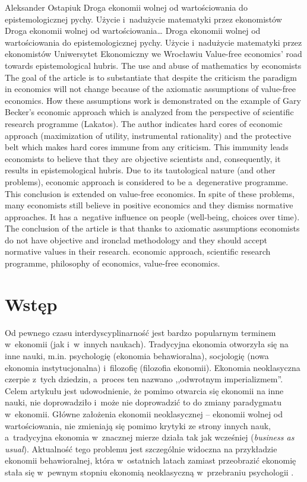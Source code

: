 \begin{artplenv}{Aleksander Ostapiuk}
	{Droga ekonomii wolnej od wartościowania do epistemologicznej pychy. Użycie i~nadużycie matematyki przez
		ekonomistów}
	{Droga ekonomii wolnej od wartościowania\ldots}
	{Droga ekonomii wolnej od wartościowania do epistemologicznej pychy. Użycie i~nadużycie matematyki przez
		ekonomistów}
	{Uniwersytet Ekonomiczny we Wrocławiu\label{ost-start}}
	{Value-free economics' road towards epistemological hubris. The use and abuse of mathematics by economists}
	{The goal of the article is to substantiate that despite the criticism the paradigm in economics will not change because of the axiomatic assumptions of value-free economics. How these assumptions work is demonstrated on the example of Gary Becker's economic approach which is analyzed from the perspective of scientific research programme (Lakatos). The author indicates hard cores of economic approach (maximization of utility, instrumental rationality) and the protective belt which makes hard cores immune from any criticism. This immunity leads economists to believe that they are objective scientists and, consequently, it results in epistemological hubris. Due to its tautological nature (and other problems), economic approach is considered to be a~degenerative programme. This conclusion is extended on value-free economics. In spite of these problems, many economists still believe in positive economics and they dismiss normative approaches. It has a~negative influence on people (well-being, choices over time). The conclusion of the article is that thanks to axiomatic assumptions economists do not have objective and ironclad methodology and they should accept normative values in their research.}
	{economic approach, scientific research programme, philosophy of economics, value-free economics.}



\section*{Wstęp}
\lettrine[loversize=0.13,lines=2,lraise=-0.05,nindent=0em,findent=0.2pt]%
{O}{}d pewnego czasu interdyscyplinarność jest bardzo popularnym terminem w~ekonomii (jak i~w~innych naukach).
Tradycyjna ekonomia otworzyła się na inne nauki, m.in. psychologię (ekonomia behawioralna), socjologię (nowa ekonomia
instytucjonalna) i~filozofię (filozofia ekonomii). Ekonomia neoklasyczna czerpie z~tych dziedzin, a~proces ten nazwano
,,odwrotnym imperializmem''. Celem artykułu jest udowodnienie, że pomimo otwarcia się ekonomii na inne nauki, nie
doprowadziło i~może nie doprowadzić to do zmiany paradygmatu
\parencite{kuhn_structure_1962}
w~ekonomii. Główne
założenia ekonomii neoklasycznej -- ekonomii wolnej od wartościowania, nie zmieniają się pomimo krytyki ze strony innych
nauk, a~tradycyjna ekonomia w~znacznej mierze działa tak jak wcześniej (\textit{business as usual}). Aktualność tego
problemu jest szczególnie widoczna na przykładzie ekonomii behawioralnej, która w~ostatnich latach zamiast przeobrazić
ekonomię stała się w~pewnym stopniu ekonomią neoklasyczną w~przebraniu psychologii
\parencite{berg_as-if_2010}.


\end{artplenv}
